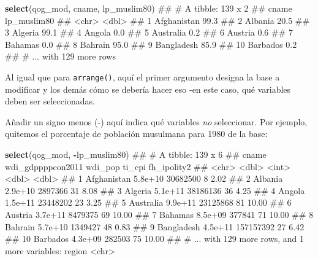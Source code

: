\documentclass[]{book}
\newenvironment{Shaded}{\begin{snugshade}}{\end{snugshade}}
\newcommand{\KeywordTok}[1]{\textcolor[rgb]{0.13,0.29,0.53}{\textbf{#1}}}
\newcommand{\OperatorTok}[1]{\textcolor[rgb]{0.81,0.36,0.00}{\textbf{#1}}}
\newcommand{\NormalTok}[1]{#1}
\begin{document}
\begin{Shaded}
\begin{Highlighting}[]
\KeywordTok{select}\NormalTok{(qog_mod, cname, lp_muslim80)}
\NormalTok{## # A tibble: 139 x 2}
\NormalTok{##          cname lp_muslim80}
\NormalTok{##          <chr>       <dbl>}
\NormalTok{##  1 Afghanistan        99.3}
\NormalTok{##  2     Albania        20.5}
\NormalTok{##  3     Algeria        99.1}
\NormalTok{##  4      Angola         0.0}
\NormalTok{##  5   Australia         0.2}
\NormalTok{##  6     Austria         0.6}
\NormalTok{##  7     Bahamas         0.0}
\NormalTok{##  8     Bahrain        95.0}
\NormalTok{##  9  Bangladesh        85.9}
\NormalTok{## 10    Barbados         0.2}
\NormalTok{## # ... with 129 more rows}
\end{Highlighting}
\end{Shaded}

Al igual que para \texttt{arrange()}, aquí el primer argumento designa
la base a modificar y los demás cómo se debería hacer eso -en este caso,
qué variables deben ser seleccionadas.

Añadir un signo menos (-) aquí indica qué variables \emph{no}
seleccionar. Por ejemplo, quitemos el porcentaje de población musulmana
para 1980 de la base:

\begin{Shaded}
\begin{Highlighting}[]
\KeywordTok{select}\NormalTok{(qog_mod, }\OperatorTok{-}\NormalTok{lp_muslim80)}
\NormalTok{## # A tibble: 139 x 6}
\NormalTok{##          cname wdi_gdppppcon2011   wdi_pop ti_cpi fh_ipolity2}
\NormalTok{##          <chr>             <dbl>     <int>  <dbl>       <dbl>}
\NormalTok{##  1 Afghanistan           5.8e+10  30682500      8        2.02}
\NormalTok{##  2     Albania           2.9e+10   2897366     31        8.08}
\NormalTok{##  3     Algeria           5.1e+11  38186136     36        4.25}
\NormalTok{##  4      Angola           1.5e+11  23448202     23        3.25}
\NormalTok{##  5   Australia           9.9e+11  23125868     81       10.00}
\NormalTok{##  6     Austria           3.7e+11   8479375     69       10.00}
\NormalTok{##  7     Bahamas           8.5e+09    377841     71       10.00}
\NormalTok{##  8     Bahrain           5.7e+10   1349427     48        0.83}
\NormalTok{##  9  Bangladesh           4.5e+11 157157392     27        6.42}
\NormalTok{## 10    Barbados           4.3e+09    282503     75       10.00}
\NormalTok{## # ... with 129 more rows, and 1 more variables: region <chr>}
\end{Highlighting}
\end{Shaded}
\end{document}
